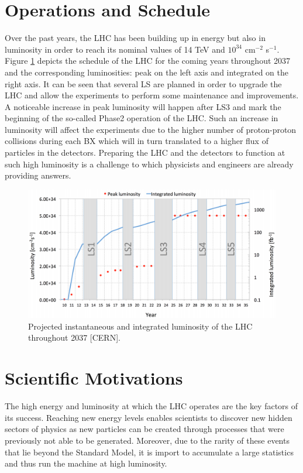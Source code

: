 	\section{Operations and Schedule}

    Over the past years, the LHC has been building up in energy but also in luminosity in order to reach its nominal values of 14 TeV and $ 10^{34} $ cm$^{-2}$ s$^{-1}$. Figure \ref{fig:I-2-futur} depicts the schedule of the LHC for the coming years throughout 2037 and the corresponding luminosities: peak on the left axis and integrated on the right axis. It can be seen that several LS are planned in order to upgrade the LHC and allow the experiments to perform some maintenance and improvements. A noticeable increase in peak luminosity will happen after LS3 and mark the beginning of the so-called Phase2 operation of the LHC. Such an increase in luminosity will affect the experiments due to the higher number of proton-proton collisions during each BX which will in turn translated to a higher flux of particles in the detectors. Preparing the LHC and the detectors to function at such high luminosity is a challenge to which physicists and engineers are already providing answers.

    \begin{figure}[h!]
      \centering
      \includegraphics[width=\textwidth]{img/I-2-LHC/lhc-schedule.png}
      \caption{Projected instantaneous and integrated luminosity of the LHC throughout 2037 [CERN].}
      \label{fig:I-2-futur}
    \end{figure}

  \section{Scientific Motivations}

    The high energy and luminosity at which the LHC operates are the key factors of its success. Reaching new energy levels enables scientists to discover new hidden sectors of physics as new particles can be created through processes that were previously not able to be generated. Moreover, due to the rarity of these events that lie beyond the Standard Model, it is import to accumulate a large statistics and thus run the machine at high luminosity. \\

